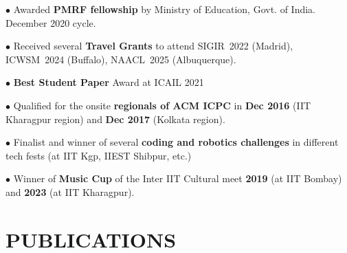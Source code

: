 \documentclass[paper=a4,fontsize=10pt]{scrartcl} %
\newcommand{\sepspace}{\vspace*{0.6em}}		%
\newcommand{\NewPart}[1]{\section*{\uppercase{#1}}}
\begin{document}
{
\small
    
    
    
    
    \noindent $\bullet$ Awarded \textbf{PMRF fellowship} by Ministry of Education, Govt. of India. December 2020 cycle. 

    \noindent $\bullet$ Received several \textbf{Travel Grants} to attend  SIGIR~2022 (Madrid), ICWSM~2024 (Buffalo), NAACL~2025 (Albuquerque). 
    \sepspace

    
    \noindent $\bullet$ \textbf{Best Student Paper} Award at ICAIL 2021 %
    
    \noindent $\bullet$ Qualified for the onsite \textbf{regionals of ACM ICPC} in \textbf{Dec 2016} (IIT Kharagpur region) and \textbf{Dec 2017} (Kolkata region). \sepspace
    
    \noindent $\bullet$ Finalist and winner of several \textbf{coding and robotics challenges} in different tech fests (at IIT Kgp, IIEST Shibpur, etc.)
    
    \noindent $\bullet$ Winner of \textbf{Music Cup} of the Inter IIT Cultural meet \textbf{2019} (at IIT Bombay) and \textbf{2023} (at IIT Kharagpur). 
}




\vspace*{-2mm}





\NewPart{Publications}{}

\vspace*{-1mm}
\end{document}
